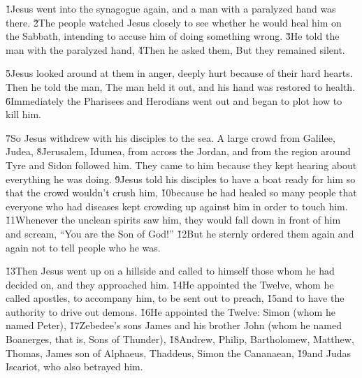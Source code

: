\v{1}Jesus went into the synagogue again, and a man with a paralyzed hand was there. \v{2}The people watched Jesus closely to see whether he would heal him on the Sabbath, intending to accuse him of doing something wrong. \v{3}He told the man with the paralyzed hand,  \v{4}Then he asked them,  But they remained silent.

\v{5}Jesus looked around at them in anger, deeply hurt because of their hard hearts. Then he told the man,  The man held it out, and his hand was restored to health. \v{6}Immediately the Pharisees and Herodians went out and began to plot how to kill him.

\v{7}So Jesus withdrew with his disciples to the sea. A large crowd from Galilee, Judea, \v{8}Jerusalem, Idumea, from across the Jordan, and from the region around Tyre and Sidon followed him. They came to him because they kept hearing about everything he was doing. \v{9}Jesus told his disciples to have a boat ready for him so that the crowd wouldn't crush him, \v{10}because he had healed so many people that everyone who had diseases kept crowding up against him in order to touch him. \v{11}Whenever the unclean spirits saw him, they would fall down in front of him and scream, ``You are the Son of God!'' \v{12}But he sternly ordered them again and again not to tell people who he was.

\v{13}Then Jesus went up on a hillside and called to himself those whom he had decided on, and they approached him. \v{14}He appointed the Twelve, whom he called apostles, to accompany him, to be sent out to preach, \v{15}and to have the authority to drive out demons. \v{16}He appointed the Twelve: Simon (whom he named Peter), \v{17}Zebedee's sons James and his brother John (whom he named Boanerges, that is, Sons of Thunder), \v{18}Andrew, Philip, Bartholomew, Matthew, Thomas, James son of Alphaeus, Thaddeus, Simon the Cananaean, \v{19}and Judas Iscariot, who also betrayed him.

